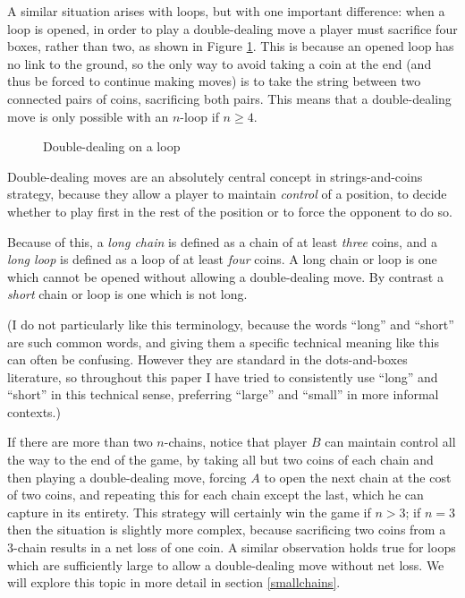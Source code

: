 \documentclass[a4paper,twocolumn]{article}
\begin{document}
A similar situation arises with loops, but with one important
difference: when a loop is opened, in order to play a double-dealing
move a player must sacrifice four boxes, rather than two, as shown in
Figure \ref{loopdoubledeal}. This is because an opened loop has no
link to the ground, so the only way to avoid taking a coin at the end
(and thus be forced to continue making moves) is to take the string
between two connected pairs of coins, sacrificing both pairs. This
means that a double-dealing move is only possible with an $n$-loop if
$n \ge 4$.

\begin{figure}
  \centering
  \def\svgscale{0.7}
  
  \caption{Double-dealing on a loop}
  \label{loopdoubledeal}
\end{figure}

Double-dealing moves are an absolutely central concept in
strings-and-coins strategy, because they allow a player to maintain
\emph{control} of a position, to decide whether to play first in the
rest of the position or to force the opponent to do so.

Because of this, a \emph{long chain} is defined as a chain of at least
\emph{three} coins, and a \emph{long loop} is defined as a loop of at
least \emph{four} coins. A long chain or loop is one which cannot be
opened without allowing a double-dealing move. By contrast a
\emph{short} chain or loop is one which is not long.

(I do not particularly like this terminology, because the words
``long'' and ``short'' are such common words, and giving them a
specific technical meaning like this can often be confusing. However
they are standard in the dots-and-boxes literature, so throughout this
paper I have tried to consistently use ``long'' and ``short'' in this
technical sense, preferring ``large'' and ``small'' in more informal
contexts.)

If there are more than two $n$-chains, notice that player $B$ can
maintain control all the way to the end of the game, by taking all but
two coins of each chain and then playing a double-dealing move,
forcing $A$ to open the next chain at the cost of two coins, and
repeating this for each chain except the last, which he can capture in
its entirety. This strategy will certainly win the game if $n>3$; if
$n=3$ then the situation is slightly more complex, because sacrificing
two coins from a 3-chain results in a net loss of one coin. A similar
observation holds true for loops which are sufficiently large to allow
a double-dealing move without net loss. We will explore this topic in
more detail in section \ref{smallchains}.
\end{document}
